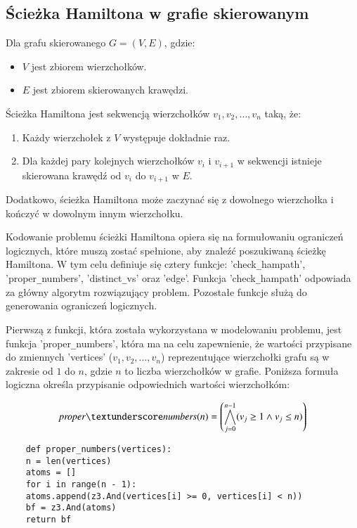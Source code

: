\subsection{Ścieżka Hamiltona w grafie skierowanym}

Dla grafu skierowanego $G = (V, E)$, gdzie:
\begin{itemize}
	\item \(V\) jest zbiorem wierzchołków.
	\item \(E\) jest zbiorem skierowanych krawędzi.
\end{itemize}
Ścieżka Hamiltona jest sekwencją wierzchołków $v_1, v_2, …, v_n$ taką, że:
\begin{enumerate}
	\item Każdy wierzchołek z \(V\) występuje dokładnie raz.
	\item Dla każdej pary kolejnych wierzchołków \(v_i\) i \(v_{i+1}\) w sekwencji istnieje skierowana krawędź od \(v_i\) do \(v_{i+1}\) w \(E\). 
\end{enumerate}

Dodatkowo, ścieżka Hamiltona może zaczynać się z dowolnego wierzchołka i kończyć w dowolnym innym wierzchołku.

Kodowanie problemu ścieżki Hamiltona opiera się na formułowaniu ograniczeń logicznych, które muszą zostać spełnione, aby znaleźć poszukiwaną ścieżkę Hamiltona. W tym celu definiuje się cztery funkcje: 'check\verb|_|hampath', 'proper\verb|_|numbers', 'distinct\verb|_|vs' oraz 'edge'. Funkcja 'check\verb|_|hampath' odpowiada za główny algorytm rozwiązujący problem. Pozostałe funkcje służą do generowania ograniczeń logicznych.

Pierwszą z funkcji, która została wykorzystana w modelowaniu problemu, jest funkcja 'proper\verb|_|numbers', która ma na celu zapewnienie, że wartości przypisane do zmiennych 'vertices' ($v_1, v_2, …, v_n$) reprezentujące wierzchołki grafu są w zakresie od $1$ do $n$, gdzie $n$ to liczba wierzchołków w grafie. Poniższa formuła logiczna określa przypisanie odpowiednich wartości wierzchołkóm:

\begin{align*}
	\mli{proper\textunderscore numbers}(n) = \left( \bigwedge_{j=0}^{n-1} (v_j \geq 1 \land v_j \leq n) \right) 
\end{align*}

\begin{lstlisting}
	def proper_numbers(vertices):
	n = len(vertices)
	atoms = []
	for i in range(n - 1):
	atoms.append(z3.And(vertices[i] >= 0, vertices[i] < n))
	bf = z3.And(atoms)
	return bf
\end{lstlisting}
\vspace{1cm}

